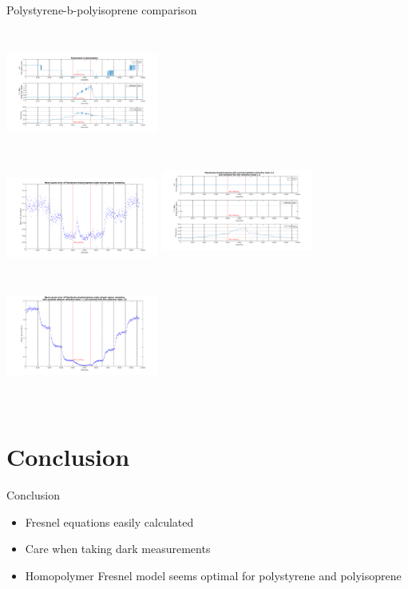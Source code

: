 \documentclass[10pt]{beamer}
\begin{document}
\begin{frame}{Polystyrene-b-polyisoprene comparison}
\begin{columns}[t]
	\centering
	\includegraphics[width=5cm,height=3.5cm]{PSbPIsinglemodel1.png}\\
	\includegraphics[width=5cm,height=3.5cm]{PSbPIsinglemodel2.png}
	\centering
	\includegraphics[width=5cm,height=4cm]{PSPIn11n18AVG1.png}\\
	\includegraphics[width=5cm,height=4cm]{PSPIn11n18AVG2.png}
\end{columns}
\end{frame}

	\section{Conclusion}
	
\begin{frame}{Conclusion}

\begin{itemize}
\item Fresnel equations easily calculated
\item Care when taking dark measurements
\item Homopolymer Fresnel model seems optimal for polystyrene and polyisoprene   
\end{itemize}

\end{frame}
\end{document}
